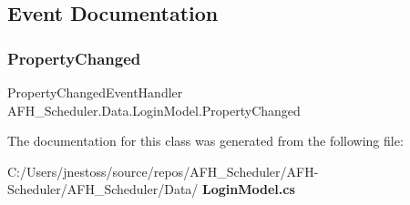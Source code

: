 \subsection{Event Documentation}
\mbox{\label{class_a_f_h___scheduler_1_1_data_1_1_login_model_a76a8c101f6af2ddf06288a66349c9cd3}} 
\subsubsection{PropertyChanged}
{\footnotesize\ttfamily Property\+Changed\+Event\+Handler A\+F\+H\+\_\+\+Scheduler.\+Data.\+Login\+Model.\+Property\+Changed}



The documentation for this class was generated from the following file\+:\begin{DoxyCompactItemize}
\item 
C\+:/\+Users/jnestoss/source/repos/\+A\+F\+H\+\_\+\+Scheduler/\+A\+F\+H-\/\+Scheduler/\+A\+F\+H\+\_\+\+Scheduler/\+Data/\textbf{ Login\+Model.\+cs}\end{DoxyCompactItemize}

